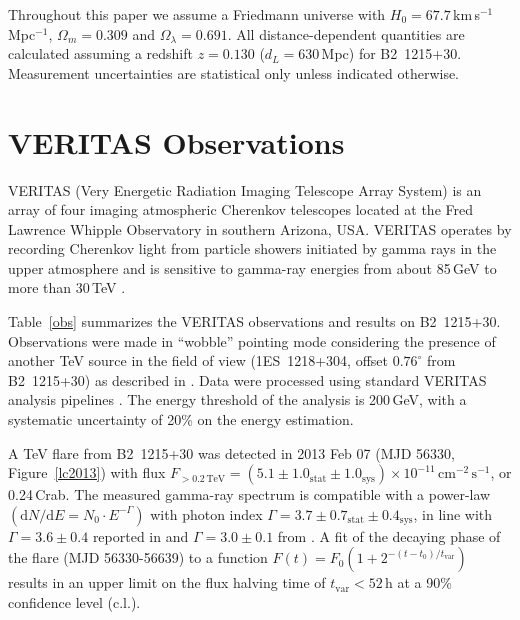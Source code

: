 \documentclass[twocolumn]{aastex6}
\def\b2{B2~1215+30}
\begin{document}
Throughout this paper we assume a Friedmann universe with $H_0=67.7$\,km\,s$^{-1}$\,Mpc$^{-1}$, $\Omega_{m} = 0.309$ and $\Omega_{\lambda} = 0.691$. All distance-dependent quantities are calculated assuming a redshift  $z=0.130$ ($d_L=630$\,Mpc) for \b2.
Measurement uncertainties are statistical only unless indicated otherwise.


\section{VERITAS Observations} 
\label{s:vts}
VERITAS (Very Energetic Radiation Imaging Telescope Array System) is 
an array of four imaging atmospheric Cherenkov telescopes located at the Fred Lawrence Whipple Observatory in southern Arizona, USA. VERITAS operates by recording Cherenkov light from particle showers initiated by gamma rays in the upper atmosphere and is sensitive to gamma-ray energies from about 85\,GeV to more than 30\,TeV \citep{holder_veritas}.


Table~\ref{obs} summarizes the VERITAS observations and results on \b2.
Observations were made in ``wobble'' pointing mode \citep{fomin94} considering the presence of another TeV source in the field of view (1ES~1218+304, offset $0.76^\circ$ from \b2)  as described in \citet{veritas_1215}.
Data were processed using standard VERITAS analysis pipelines 
 \citep[][]{ver_analysis2,ver_analysis}.
The energy threshold of the analysis is 200\,GeV, 
with a systematic uncertainty of 20\% on the energy estimation.

A TeV flare from \b2 was detected 
in 2013 Feb 07 (MJD 56330, Figure~\ref{lc2013}) with flux $F_{>0.2\,\mathrm{TeV}}=\left(5.1 \pm 1.0_\mathrm{stat} \pm 1.0_\mathrm{sys} \right) \times 10^{-11}\,\mathrm{cm}^{-2}\,\mathrm{s}^{-1}$, or 0.24\,Crab. 
The measured gamma-ray spectrum is compatible with a power-law $\left(\mathrm{d}N/\mathrm{d}E=N_0 \cdot E^{-\Gamma}\right)$ with photon index $\Gamma = 3.7 \pm 0.7_\mathrm{stat} \pm 0.4_\mathrm{sys}$, in line with $\Gamma = 3.6 \pm 0.4$ reported in \citet{veritas_1215} and $\Gamma = 3.0 \pm 0.1$ from \citet{magic_1215}. A fit of the decaying phase of the flare (MJD 56330-56639) to a function $F\left(t\right) = F_0 \left(1+2^{-(t-t_0)/t_\mathrm{var}}\right)$ results in an upper limit on the flux halving time of $t_\mathrm{var} < 52$\,h at a 90\% confidence level (c.l.). 
\end{document}
